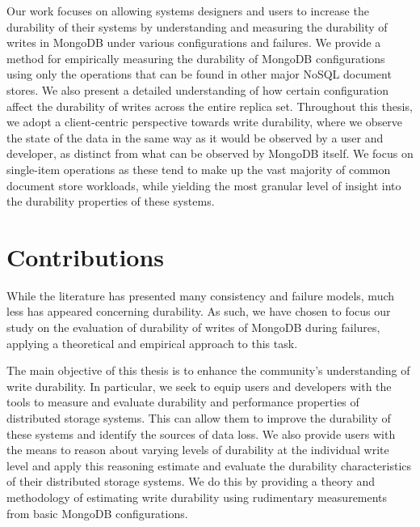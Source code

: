 Our work focuses on allowing systems designers and users to increase the durability of their systems by understanding and measuring the durability of writes in MongoDB under various configurations and failures. We provide a method for empirically measuring the durability of MongoDB configurations using only the operations that can be found in other major NoSQL document stores. We also present a detailed understanding of how certain configuration affect the durability of writes across the entire replica set. Throughout this thesis, we adopt a client-centric perspective towards write durability, where we observe the state of the data in the same way as it would be observed by a user and developer, as distinct from what can be observed by MongoDB itself. We focus on single-item operations as these tend to make up the vast majority of common document store workloads, while yielding the most granular level of insight into the durability properties of these systems.  %

\section{Contributions}
While the literature has presented many consistency and failure models, much less has appeared concerning durability. As such, we have chosen to focus our study on the evaluation of durability of writes of MongoDB during failures, applying a theoretical and empirical approach to this task.

The main objective of this thesis is to enhance the community's understanding of write durability. In particular, we seek to equip users and developers with the tools to measure and evaluate durability and performance properties of distributed storage systems. This can allow them to improve the durability of these systems and identify the sources of data loss. We also provide users with the means to reason about varying levels of durability at the individual write level and apply this reasoning estimate and evaluate the durability characteristics of their distributed storage systems. We do this by providing a theory and methodology of estimating write durability using rudimentary measurements from basic MongoDB configurations.

